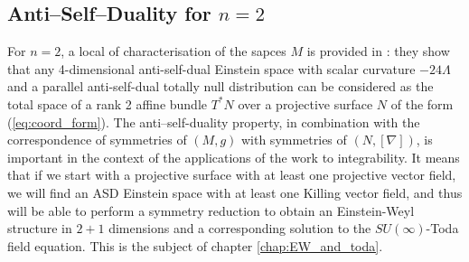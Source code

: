 \subsection{Anti--Self--Duality for $n=2$}

For $n=2$, a local of characterisation of the sapces $M$ is provided in
\cite{DM}: they show that any 4-dimensional anti-self-dual
Einstein space with scalar curvature $-24\Lambda$ and a parallel
anti-self-dual totally null distribution can be considered as the
total space of a rank 2 affine bundle $T^{*}N$ over a projective
surface $N$ of the form (\ref{eq:coord_form}). The anti--self-duality property, in combination with the correspondence of symmetries of $(M,g)$ with symmetries of $(N,[\nabla])$, is important in the context of the applications of
the work \cite{DM} to integrability. It means that
if we start with a projective surface with at least one projective
vector field, we will find an ASD Einstein space with at least one
Killing vector field, and thus will be able to perform a symmetry
reduction to obtain an Einstein-Weyl structure in $2+1$ dimensions
and a corresponding solution to the $SU(\infty)$-Toda field equation. This is the subject of chapter \ref{chap:EW_and_toda}.
